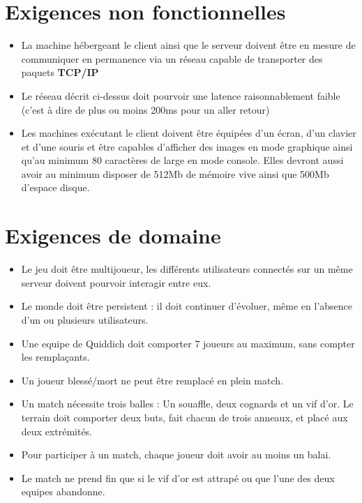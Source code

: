 \documentclass[a4paper]{report}
\begin{document}

\section{Exigences non fonctionnelles}
\begin{itemize}
    \item La machine hébergeant le \gls{client} ainsi que le \gls{serveur} doivent être en mesure de communiquer en permanence via un réseau capable de transporter des paquets \textbf{TCP/IP}
    \item Le réseau décrit ci-dessus doit pourvoir une latence raisonnablement faible (c'est à dire de plus ou moins 200ms pour un aller retour)
    \item Les machines exécutant le \gls{client} doivent être équipées d'un écran, d'un clavier et d'une souris et être capables d'afficher des images en mode graphique ainsi qu'au minimum 80 caractères de large en mode console. Elles devront aussi avoir au minimum disposer de 512Mb de mémoire vive ainsi que 500Mb d'espace disque.
\end{itemize}


\section{Exigences de domaine}
\begin{itemize}
    \item Le jeu doit être multijoueur, les différents \glspl{utilisateur} connectés sur un même \gls{serveur} doivent pourvoir interagir entre eux.
    \item Le monde doit être persistent : il doit continuer d'évoluer, même en l'absence d'un ou plusieurs \glspl{utilisateur}.
    \item Une \gls{equipe} de Quiddich doit comporter 7 \glspl{joueur} au maximum, sans compter les remplaçants.
    \item Un \gls{joueur} blessé/mort ne peut être remplacé en plein match.
    \item Un match nécessite trois balles : Un souaffle, deux cognards et un vif d'or. Le terrain doit comporter deux buts, fait chacun de trois anneaux, et placé aux deux extrémités.
    \item Pour participer à un match, chaque \gls{joueur} doit avoir au moins un balai.
    \item Le match ne prend fin que si le vif d'or est attrapé ou que l'une des deux \glspl{equipe} abandonne.

\end{itemize}
\end{document}

